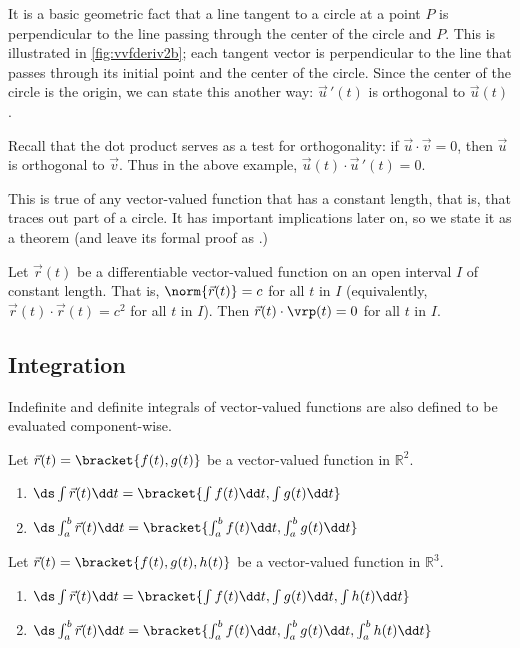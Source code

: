 It is a basic geometric fact that a line tangent to a circle at a point $P$ is perpendicular to the line passing through the center of the circle and $P$. This is illustrated in \autoref{fig:vvfderiv2b}; each tangent vector is perpendicular to the line that passes through its initial point and the center of the circle. Since the center of the circle is the origin, we can state this another way: $\vec u\,'(t)$ is orthogonal to $\vec u(t)$.

Recall that the dot product serves as a test for orthogonality: if $\vec u\cdot \vec v = 0$, then $\vec u$ is orthogonal to $\vec v$. Thus in the above example, $\vec u(t)\cdot \vec u\,'(t)=0$.

This is true of any vector-valued function that has a constant length, that is, that traces out part of a circle. It has important implications later on, so we state it as a theorem (and leave its formal proof as .)

\begin{theorem}\label{thm:vects_of_constant_length}%
Let $\vec r(t)$ be a differentiable vector-valued function on an open interval $I$ of constant length. That is, $\norm{\vec r(t)} = c$ for all $t$ in $I$ (equivalently, $\vec r(t)\cdot \vec r(t) = c^2$ for all $t$ in $I$). 
Then $\vec r(t)\cdot\vrp(t) = 0$ for all $t$ in $I$.
\end{theorem}

\subsection{Integration}

Indefinite and definite integrals of vector-valued functions are also defined to be evaluated component-wise.

\begin{definition}\label{thm:vvf_integration}%
Let $\vec r(t) =\bracket{f(t),g(t)}$ be a vector-valued function in $\mathbb{R}^2$.
\begin{enumerate}
	\item $\ds \int \vec r(t)\dd t =\bracket{\int f(t)\dd t, \int g(t)\dd t}$
	\item	$\ds \int_a^b \vec r(t)\dd t =\bracket{\int_a^b f(t)\dd t, \int_a^b g(t)\dd t}$
\end{enumerate}
Let $\vec r(t) =\bracket{f(t),g(t),h(t)}$ be a vector-valued function in $\mathbb{R}^3$.
\begin{enumerate}
	\item $\ds \int \vec r(t)\dd t =\bracket{\int f(t)\dd t, \int g(t)\dd t, \int h(t)\dd t}$
	\item	$\ds \int_a^b \vec r(t)\dd t =\bracket{\int_a^b f(t)\dd t, \int_a^b g(t)\dd t, \int_a^b h(t)\dd t}$
\end{enumerate}
\end{definition}

